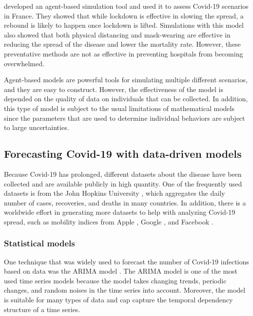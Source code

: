 \citeauthor{hoertelStochasticAgentbasedModel2020} \cite{hoertelStochasticAgentbasedModel2020} developed an agent-based simulation tool and used it to assess Covid-19 scenarios in France.
They showed that while lockdown is effective in slowing the spread, a rebound is likely to happen once lockdown is lifted.
Simulations with this model also showed that both physical distancing and mask-wearing are effective in reducing the spread of the disease and lower the mortality rate.
However, these preventative methods are not as effective in preventing hospitals from becoming overwhelmed.

Agent-based models are powerful tools for simulating multiple different scenarios, and they are easy to construct.
However, the effectiveness of the model is depended on the quality of data on individuals that can be collected.
In addition, this type of model is subject to the usual limitations of mathematical models since the parameters that are used to determine individual behaviors are subject to large uncertainties.

\subsection{Forecasting Covid-19 with data-driven models}

Because Covid-19 has prolonged, different datasets about the disease have been collected and are available publicly in high quantity.
One of the frequently used datasets is from the John Hopkins University \cite{dongInteractiveWebbasedDashboard2020}, which aggregates the daily number of cases, recoveries, and deaths in many countries.
In addition, there is a worldwide effort in generating more datasets to help with analyzing Covid-19 spread, such as mobility indices from Apple \cite{COVID19Mobility}, Google \cite{COVID19Mobility}, and Facebook \cite{DataGoodTools}.

\subsubsection{Statistical models}

One technique that was widely used to forecast the number of Covid-19 infections based on data was the \gls{ARIMA} model \cite{box2015time}.
The \gls{ARIMA} model is one of the most used time series models because the model takes changing trends, periodic changes, and random noises in the time series into account.
Moreover, the model is suitable for many types of data and cap capture the temporal dependency structure of a time series.

